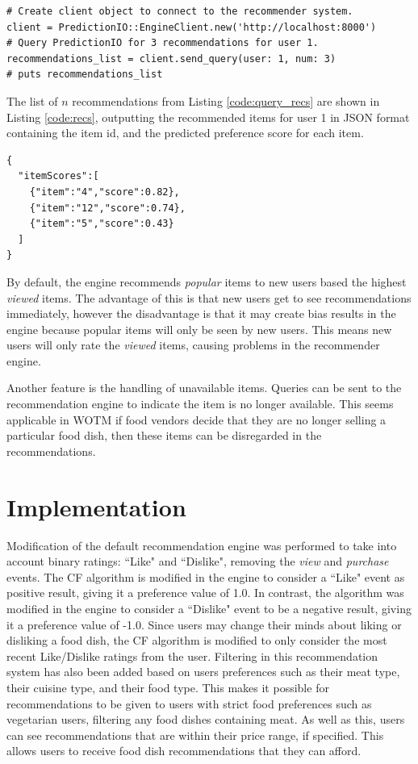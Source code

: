 \begin{lstlisting}[caption={Query for recommendations}, label={code:query_recs}]
# Create client object to connect to the recommender system.
client = PredictionIO::EngineClient.new('http://localhost:8000')
# Query PredictionIO for 3 recommendations for user 1.
recommendations_list = client.send_query(user: 1, num: 3)
# puts recommendations_list
\end{lstlisting}

The list of $n$ recommendations from Listing \ref{code:query_recs} are shown in Listing \ref{code:recs}, outputting the recommended items for user 1 in JSON format containing the item id, and the predicted preference score for each item. 
\begin{lstlisting}[caption={Recommendations for user 1}, label={code:recs}]
{
  "itemScores":[
    {"item":"4","score":0.82},
    {"item":"12","score":0.74},
    {"item":"5","score":0.43}
  ]
}
\end{lstlisting}

By default, the engine recommends \textit{popular} items to new users based the highest \textit{viewed} items. The advantage of this is that new users get to see recommendations immediately, however the disadvantage is that it may create bias results in the engine because popular items will only be seen by new users. This means new users will only rate the \textit{viewed} items, causing problems in the recommender engine. 

Another feature is the handling of unavailable items. Queries can be sent to the recommendation engine to indicate the item is no longer available. This seems applicable in WOTM if food vendors decide that they are no longer selling a particular food dish, then these items can be disregarded in the recommendations. 

\section{Implementation} \label{implementation}

Modification of the default recommendation engine was performed to take into account binary ratings: ``Like" and ``Dislike", removing the \textit{view} and \textit{purchase} events. The CF algorithm is modified in the engine to consider a ``Like" event as positive result, giving it a preference value of 1.0. In contrast, the algorithm was modified in the engine to consider a ``Dislike" event to be a negative result, giving it a preference value of -1.0. Since users may change their minds about liking or disliking a food dish, the CF algorithm is modified to only consider the most recent Like/Dislike ratings from the user. Filtering in this recommendation system has also been added based on users preferences such as their meat type, their cuisine type, and their food type. This makes it possible for recommendations to be given to users with strict food preferences such as vegetarian users, filtering any food dishes containing meat. As well as this, users can see recommendations that are within their price range, if specified. This allows users to receive food dish recommendations that they can afford.

